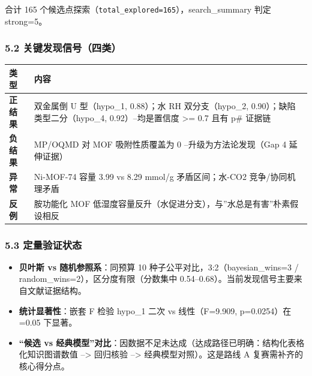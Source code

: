 \documentclass[12pt,a4paper]{ctexart}
\providecommand{\tightlist}{%
  \setlength{\itemsep}{0pt}\setlength{\parskip}{0pt}}
\begin{document}
合计 165 个候选点探索（\texttt{total\_explored=165}），search\_summary 判定 strong=5。

\subsubsection{5.2 关键发现信号（四类）}\label{ux5173ux952eux53d1ux73b0ux4fe1ux53f7ux56dbux7c7b}

{\def\LTcaptype{none} %
\begin{longtable}[]{@{}
  >{\raggedright\arraybackslash}p{}
  >{\raggedright\arraybackslash}p{}@{}}
\toprule\noalign{}
\begin{minipage}[b]{\linewidth}\raggedright
类型
\end{minipage} & \begin{minipage}[b]{\linewidth}\raggedright
内容
\end{minipage} \\
\midrule\noalign{}
\endhead
\bottomrule\noalign{}
\endlastfoot
\textbf{正结果} & 双金属倒 U 型（hypo\_1, 0.88）；水 RH 双分支（hypo\_2, 0.90）；缺陷类型二分（hypo\_4, 0.92）--均是置信度 \textgreater= 0.7 且有 p\# 证据链 \\
\textbf{负结果} & MP/OQMD 对 MOF 吸附性质覆盖为 0 --升级为方法论发现（Gap 4 延伸证据） \\
\textbf{异常} & Ni-MOF-74 容量 3.99 vs 8.29 mmol/g 矛盾区间；水-CO2 竞争/协同机理矛盾 \\
\textbf{反例} & 胺功能化 MOF 低湿度容量反升（水促进分支），与''水总是有害''朴素假设相反 \\
\end{longtable}
}

\subsubsection{5.3 定量验证状态}\label{ux5b9aux91cfux9a8cux8bc1ux72b6ux6001}

\begin{itemize}
\tightlist
\item
  \textbf{贝叶斯 vs 随机参照系}：同预算 10 种子公平对比，3:2（bayesian\_wins=3 / random\_wins=2），区分度有限（分数集中 0.54--0.68）。当前发现信号主要来自文献证据结构。
\item
  \textbf{统计显著性}：嵌套 F 检验 hypo\_1 二次 vs 线性（F=9.909, p=0.0254）在 =0.05 下显著。
\item
  \textbf{``候选 vs 经典模型''对比}：因数据不足未达成（达成路径已明确：结构化表格化知识图谱数值 --\textgreater{} 回归核验 --\textgreater{} 经典模型对照）。这是路线 A 复赛需补齐的核心得分点。
\end{itemize}
\end{document}
